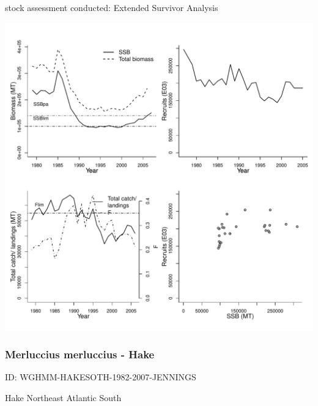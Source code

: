 stock assessment conducted: Extended Survivor Analysis 
\begin{center}
\vspace{-0.2cm}\includegraphics[scale=0.65]{../tex/figures/plot-WGHMM-HAKENRTN-1977-2007-JENNINGS.pdf}
\end{center}

\newpage
\subsubsection{Merluccius merluccius - Hake}
ID: WGHMM-HAKESOTH-1982-2007-JENNINGS

Hake Northeast Atlantic South 

